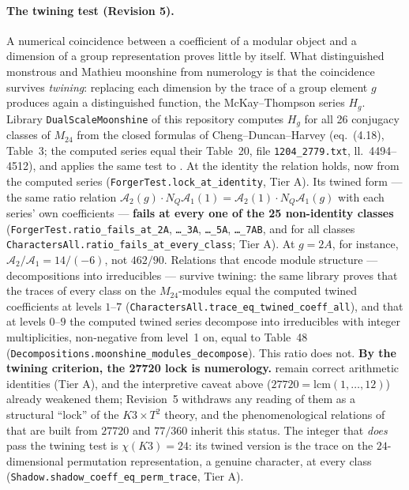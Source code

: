 \documentclass[11pt,a4paper]{article}
\theoremstyle{remark}
\begin{document}
\paragraph{The twining test (Revision 5).} \label{sec:twining-verdict}
A numerical coincidence between a coefficient of a modular object and a dimension of a group
representation proves little by itself. What distinguished monstrous and Mathieu moonshine from
numerology is that the coincidence survives \emph{twining}: replacing each dimension by the trace of a
group element $g$ produces again a distinguished function, the McKay--Thompson series $H_g$. Library
\texttt{DualScaleMoonshine} of this repository computes $H_g$ for all 26 conjugacy classes of $M_{24}$
from the closed formulas of Cheng--Duncan--Harvey \cite{CDH2012} (eq.~(4.18), Table~3; the computed
series equal their Table~20, file \texttt{1204\_2779.txt}, ll.~4494--4512),
and applies the same test to . At the identity the relation holds, now from the
computed series (\texttt{ForgerTest.\discretionary{}{}{}lock\_\discretionary{}{}{}at\_\discretionary{}{}{}identity},
Tier A). Its twined form --- the same ratio relation $\mathcal A_2(g)\cdot N_Q\mathcal A_1(1)=
\mathcal A_2(1)\cdot N_Q\mathcal A_1(g)$ with each series' own coefficients --- \textbf{fails at
every one of the 25 non-identity classes}
(\texttt{ForgerTest.\discretionary{}{}{}ratio\_\discretionary{}{}{}fails\_\discretionary{}{}{}at\_\discretionary{}{}{}2A},
\texttt{\dots\_3A}, \texttt{\dots\_5A}, \texttt{\dots\_7AB}, and for all classes
\texttt{CharactersAll.\discretionary{}{}{}ratio\_\discretionary{}{}{}fails\_\discretionary{}{}{}at\_\discretionary{}{}{}every\_\discretionary{}{}{}class};
Tier A). At $g=2A$, for instance, $\mathcal A_2/\mathcal A_1=14/(-6)$, not $462/90$. Relations that
encode module structure --- decompositions into irreducibles --- survive twining: the same library
proves that the traces of every class on the $M_{24}$-modules equal the computed twined coefficients at
levels $1$--$7$ (\texttt{CharactersAll.\discretionary{}{}{}trace\_\discretionary{}{}{}eq\_\discretionary{}{}{}twined\_\discretionary{}{}{}coeff\_\discretionary{}{}{}all}),
and that at levels $0$--$9$ the computed twined series decompose into irreducibles with integer
multiplicities, non-negative from level~1 on, equal to \cite{CDH2012} Table~48
(\texttt{Decompositions.\discretionary{}{}{}moonshine\_\discretionary{}{}{}modules\_\discretionary{}{}{}decompose}). This ratio does not. \textbf{By the twining criterion, the 27720 lock is numerology.}
 remain correct arithmetic identities (Tier A), and the
interpretive caveat above ($27720=\mathrm{lcm}(1,\dots,12)$) already weakened them; Revision~5 withdraws
any reading of them as a structural ``lock'' of the $K3\times T^2$ theory, and the phenomenological
relations of  that are built from $27720$ and $77/360$ inherit this status. The
integer that \emph{does} pass the twining test is $\chi(K3)=24$: its twined version is the trace on the
$24$-dimensional permutation representation, a genuine character, at every class
(\texttt{Shadow.\discretionary{}{}{}shadow\_\discretionary{}{}{}coeff\_\discretionary{}{}{}eq\_\discretionary{}{}{}perm\_\discretionary{}{}{}trace}, Tier A).
\end{document}

